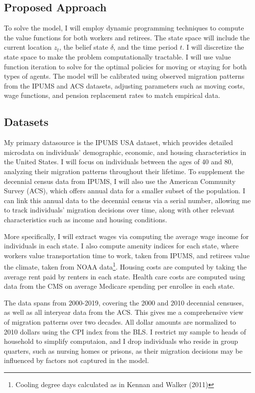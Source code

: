 \documentclass[11pt,a4paper]{article}
\begin{document}
\subsection{Proposed Approach}
\label{subsec:approach}

To solve the model, I will employ dynamic programming techniques to compute the value functions for both workers and retirees. The state space will include the current location $z_t$, the belief state $\delta$, and the time period $t$. I will discretize the state space to make the problem computationally tractable. I will use value function iteration to solve for the optimal policies for moving or staying for both types of agents. The model will be calibrated using observed migration patterns from the IPUMS and ACS datasets, adjusting parameters such as moving costs, wage functions, and pension replacement rates to match empirical data. 


\subsection{Datasets}
\label{subsec:datasets}

My primary datasource is the IPUMS USA dataset, which provides detailed microdata on individuals' demographic, economic, and housing characteristics in the United States. I will focus on individuals between the ages of 40 and 80, analyzing their migration patterns throughout their lifetime. To supplement the decennial census data from IPUMS, I will also use the American Community Survey (ACS), which offers annual data for a smaller subset of the population. I can link this annual data to the decennial census via a serial number, allowing me to track individuals' migration decisions over time, along with other relevant characteristics such as income and housing conditions.

More specifically, I will extract wages via computing the average wage income for individuals in each state. I also compute amenity indices for each state, where workers value transportation time to work, taken from IPUMS, and retirees value the climate, taken from NOAA data\footnote{Cooling degree days calculated as in Kennan and Walker (2011)}. Housing costs are computed by taking the average rent paid by renters in each state. Health care costs are computed using data from the CMS on average Medicare spending per enrollee in each state. 

The data spans from 2000-2019, covering the 2000 and 2010 decennial censuses, as well as all interyear data from the ACS. This gives me a comprehensive view of migration patterns over two decades. All dollar amounts are normalized to 2010 dollars using the CPI index from the BLS. I restrict my sample to heads of household to simplify computaion, and I drop individuals who reside in group quarters, such as nursing homes or prisons, as their migration decisions may be influenced by factors not captured in the model.
\end{document}
